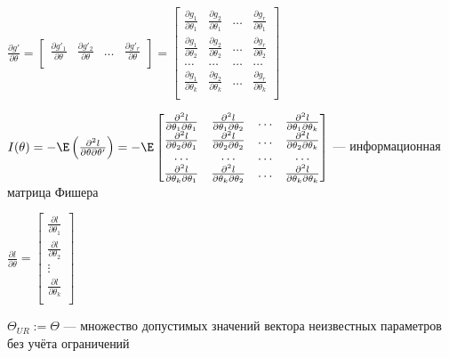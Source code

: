 \documentclass[pdftex,11pt,openany]{book}\usepackage[]{graphicx}\usepackage[]{color}
\begin{document}
\begin{problemtext}
$\frac{\partial g'}{\partial \theta} = \begin{bmatrix}
\frac{\partial g'_1}{\partial \theta} & \frac{\partial g'_2}{\partial \theta} & \ldots & \frac{\partial g'_r}{\partial \theta} \\
\end{bmatrix} = \begin{bmatrix}
\frac{\partial g_1}{\partial \theta_1} & \frac{\partial g_2}{\partial \theta_1} & \ldots & \frac{\partial g_r}{\partial \theta_1}\\
\frac{\partial g_1}{\partial \theta_2} & \frac{\partial g_2}{\partial \theta_2} & \ldots & \frac{\partial g_r}{\partial \theta_2}\\
\ldots & \ldots & \ldots & \ldots \\
\frac{\partial g_1}{\partial \theta_k} & \frac{\partial g_2}{\partial \theta_k} & \ldots & \frac{\partial g_r}{\partial \theta_k}\\
\end{bmatrix}$

$I(\theta) = -\E \left(\frac{\partial^2 l}{\partial \theta \partial \theta'}\right) = - \E \begin{bmatrix}
\frac{\partial^2 l}{\partial \theta_1 \partial \theta_1} & \frac{\partial^2 l}{\partial \theta_1 \partial \theta_2} & \ldots & \frac{\partial^2 l}{\partial \theta_1 \partial \theta_k} \\
\frac{\partial^2 l}{\partial \theta_2 \partial \theta_1} & \frac{\partial^2 l}{\partial \theta_2 \partial \theta_2} & \ldots & \frac{\partial^2 l}{\partial \theta_2 \partial \theta_k} \\
\ldots & \ldots & \ldots & \ldots \\
\frac{\partial^2 l}{\partial \theta_k \partial \theta_1} & \frac{\partial^2 l}{\partial \theta_k \partial \theta_2} & \ldots & \frac{\partial^2 l}{\partial \theta_k \partial \theta_k} \\
\end{bmatrix}$ --- информационная матрица Фишера

$\frac{\partial l}{\partial \theta} = \begin{bmatrix}
\frac{\partial l}{\partial \theta_1} \\
\frac{\partial l}{\partial \theta_2} \\
\vdots \\
\frac{\partial l}{\partial \theta_k} \\
\end{bmatrix}$

$\Theta_{UR} := \Theta$ --- множество допустимых значений вектора неизвестных параметров без учёта ограничений


\end{problemtext}
\end{document}
